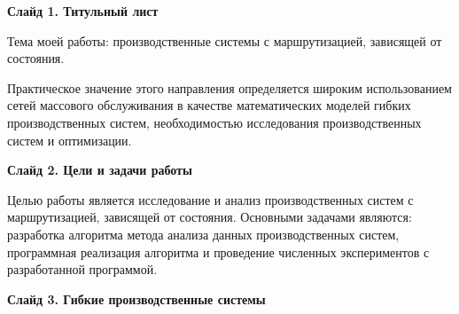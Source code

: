\documentclass[a4paper,14pt]{extarticle}
\theoremstyle{note}
\begin{document}
\textbf{Слайд 1. Титульный лист}

Тема моей работы: производственные системы с маршрутизацией, зависящей от состояния.

Практическое значение этого направления определяется широким использованием сетей массового обслуживания в качестве математических моделей гибких производственных систем, необходимостью исследования производственных систем и оптимизации.

\textbf{Слайд 2. Цели и задачи работы}

Целью работы является исследование и анализ производственных систем с маршрутизацией, зависящей от состояния. Основными задачами являются: разработка алгоритма метода анализа данных производственных систем, программная реализация алгоритма и проведение численных экспериментов с разработанной программой.


\textbf{Слайд 3. Гибкие производственные системы}
\end{document}
